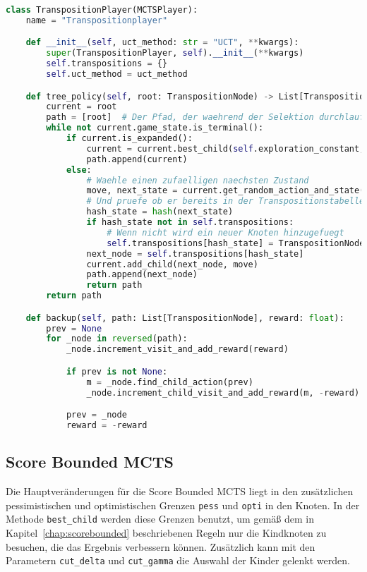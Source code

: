 \begin{lstlisting}[language=Python,label={lst:transposition-player}]
class TranspositionPlayer(MCTSPlayer):
    name = "Transpositionplayer"

    def __init__(self, uct_method: str = "UCT", **kwargs):
        super(TranspositionPlayer, self).__init__(**kwargs)
        self.transpositions = {}
        self.uct_method = uct_method

    def tree_policy(self, root: TranspositionNode) -> List[TranspositionNode]:
        current = root
        path = [root]  # Der Pfad, der waehrend der Selektion durchlaufen wird
        while not current.game_state.is_terminal():
            if current.is_expanded():
                current = current.best_child(self.exploration_constant, uct_method=self.uct_method)
                path.append(current)
            else:
                # Waehle einen zufaelligen naechsten Zustand
                move, next_state = current.get_random_action_and_state()
                # Und pruefe ob er bereits in der Transpositionstabelle enthalten ist
                hash_state = hash(next_state)
                if hash_state not in self.transpositions:
                    # Wenn nicht wird ein neuer Knoten hinzugefuegt
                    self.transpositions[hash_state] = TranspositionNode(game_state=next_state, parent=current)
                next_node = self.transpositions[hash_state]
                current.add_child(next_node, move)
                path.append(next_node)
                return path
        return path

    def backup(self, path: List[TranspositionNode], reward: float):
        prev = None
        for _node in reversed(path):
            _node.increment_visit_and_add_reward(reward)

            if prev is not None:
                m = _node.find_child_action(prev)
                _node.increment_child_visit_and_add_reward(m, -reward)

            prev = _node
            reward = -reward
\end{lstlisting}

\subsection{Score Bounded MCTS}
Die Hauptveränderungen für die Score Bounded MCTS liegt in den zusätzlichen pessimistischen und optimistischen Grenzen \verb|pess| und \verb|opti| in den Knoten.
In der Methode \verb|best_child| werden diese Grenzen benutzt, um gemäß dem in Kapitel~\ref{chap:scorebounded} beschriebenen Regeln nur die Kindknoten zu besuchen, die das Ergebnis verbessern können.
Zusätzlich kann mit den Parametern \verb|cut_delta| und \verb|cut_gamma| die Auswahl der Kinder gelenkt werden.

